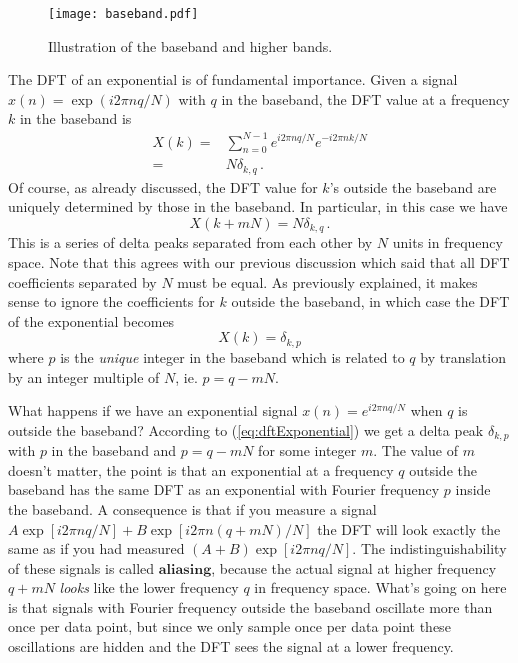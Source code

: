\begin{figure*}[t]
\begin{centering}
\texttt{[image: baseband.pdf]}
\par\end{centering}
\caption{Illustration of the baseband and higher bands.}
\label{fig:baseband}
\end{figure*}



The DFT of an exponential is of fundamental importance.
Given a signal $x(n)=\exp(i2\pi nq/N)$ with $q$ in the baseband, the DFT value at a frequency $k$ in the baseband is
\begin{align}
  X(k) =& \sum_{n=0}^{N-1} e^{i2\pi nq/N}e^{-i2\pi nk/N} \\
  =& N \delta_{k, q} \, .
\end{align}
Of course, as already discussed, the DFT value for $k$'s outside the baseband are uniquely determined by those in the baseband.
In particular, in this case we have
\begin{equation}
  X(k + mN) = N \delta_{k, q} \, .
\end{equation}
This is a series of delta peaks separated from each other by $N$ units in frequency space.
Note that this agrees with our previous discussion which said that all DFT coefficients separated by $N$ must be equal.
As previously explained, it makes sense to ignore the coefficients for $k$ outside the baseband, in which case the DFT of the exponential becomes
\begin{equation}
X(k) = \delta_{k,p} \label{eq:dftExponential}
\end{equation}
where $p$ is the \emph{unique} integer in the baseband which is related to $q$ by translation by an integer multiple of $N$, ie. $p=q-mN$.


What happens if we have an exponential signal $x(n)=e^{i2\pi nq/N}$ when $q$ is outside the baseband?
According to (\ref{eq:dftExponential}) we get a delta peak $\delta_{k,p}$ with $p$ in the baseband and $p = q-mN$ for some integer $m$.
The value of $m$ doesn't matter, the point is that an exponential at a frequency $q$ outside the baseband has the same DFT as an exponential with Fourier frequency $p$ inside the baseband.
A consequence is that if you measure a signal $A\exp\left[i2\pi nq/N\right]+B\exp\left[i2\pi n(q+mN)/N\right]$ the DFT will look exactly the same as if you had measured $(A+B)\exp\left[i2\pi nq/N\right]$.
The indistinguishability of these signals is called $\textbf{aliasing}$, because the actual signal at higher frequency $q+mN$ \emph{looks} like the lower frequency $q$ in frequency space.
What's going on here is that signals with Fourier frequency outside the baseband oscillate more than once per data point, but since we only sample once per data point these oscillations are hidden and the DFT sees the signal at a lower frequency.

